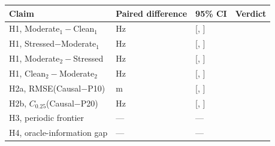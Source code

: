 \begin{tabular}{@{}llll@{}}
\toprule
Claim & Paired difference & 95\% CI & Verdict \\
\midrule
H1, Moderate$_1-$Clean$_1$ & \MetricElevenHoneOneMean{} Hz & [\MetricElevenHoneOneLo{}, \MetricElevenHoneOneHi{}] & \MetricElevenHoneVerdict{} \\
H1, Stressed$-$Moderate$_1$ & \MetricElevenHoneTwoMean{} Hz & [\MetricElevenHoneTwoLo{}, \MetricElevenHoneTwoHi{}] & \MetricElevenHoneVerdict{} \\
H1, Moderate$_2-$Stressed & \MetricElevenHoneThreeMean{} Hz & [\MetricElevenHoneThreeLo{}, \MetricElevenHoneThreeHi{}] & \MetricElevenHoneVerdict{} \\
H1, Clean$_2-$Moderate$_2$ & \MetricElevenHoneFourMean{} Hz & [\MetricElevenHoneFourLo{}, \MetricElevenHoneFourHi{}] & \MetricElevenHoneVerdict{} \\
H2a, RMSE(Causal$-$P10) & \MetricElevenHtwoaMean{} m & [\MetricElevenHtwoaLo{}, \MetricElevenHtwoaHi{}] & \MetricElevenHtwoaVerdict{} \\
H2b, $C_{0.25}$(Causal$-$P20) & \MetricElevenHtwobMean{} Hz & [\MetricElevenHtwobLo{}, \MetricElevenHtwobHi{}] & \MetricElevenHtwobVerdict{} \\
H3, periodic frontier & --- & --- & \MetricElevenHthreeVerdict{} \\
H4, oracle-information gap & --- & --- & \MetricElevenHfourVerdict{} \\
\bottomrule
\end{tabular}